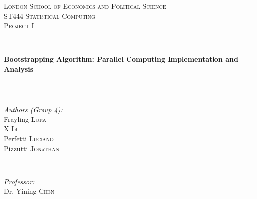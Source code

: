 \documentclass[11pt]{article}
\begin{document}
\begin{titlepage}

\newcommand{\HRule}{\rule{\linewidth}{0.5mm}} %

\center %


\textsc{\LARGE London School of Economics and Political Science}\\[1.0cm] %
\textsc{\Large ST444 Statistical Computing}\\[0.5cm] %
\textsc{\large Project I}\\[0.5cm] %


\HRule \\[0.4cm]
{ \Large \bfseries Bootstrapping Algorithm: Parallel Computing Implementation and Analysis}\\[0.4cm] %
\HRule \\[1.5cm]


\begin{minipage}{0.4\textwidth}
\begin{flushleft} \large
\emph{Authors (Group 4):}\\
Frayling \textsc{Lora} \\ %
X \textsc{Li} \\
Perfetti \textsc{Luciano} \\
Pizzutti \textsc{Jonathan} \\
\end{flushleft}
\end{minipage}
~
\begin{minipage}{0.4\textwidth}
\begin{flushright} \large
\emph{Professor:} \\
Dr. Yining \textsc{Chen} %
\end{flushright}
\end{minipage}\\[2cm]


\end{titlepage}
\end{document}
